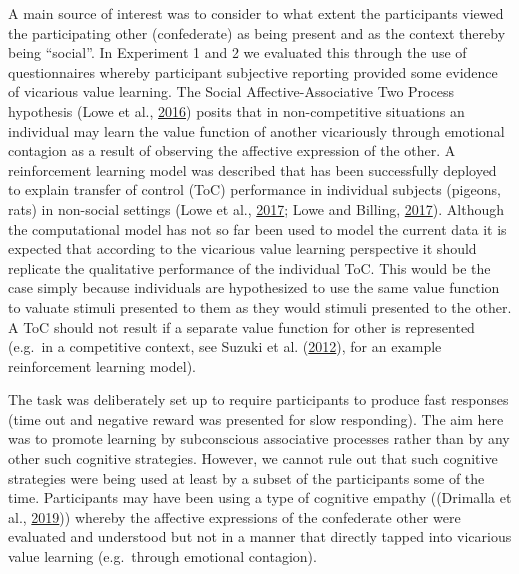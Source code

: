 \documentclass[]{elsarticle} %
\begin{document}
A main source of interest was to consider to what extent the
participants viewed the participating other (confederate) as being
present and as the context thereby being ``social''. In Experiment 1 and
2 we evaluated this through the use of questionnaires whereby
participant subjective reporting provided some evidence of vicarious
value learning. The Social Affective-Associative Two Process hypothesis
(Lowe et al., \protect\hyperlink{ref-lowe2016minimalist}{2016}) posits
that in non-competitive situations an individual may learn the value
function of another vicariously through emotional contagion as a result
of observing the affective expression of the other. A reinforcement
learning model was described that has been successfully deployed to
explain transfer of control (ToC) performance in individual subjects
(pigeons, rats) in non-social settings (Lowe et al.,
\protect\hyperlink{ref-lowe2017affective1}{2017}; Lowe and Billing,
\protect\hyperlink{ref-lowe2017affective}{2017}). Although the
computational model has not so far been used to model the current data
it is expected that according to the vicarious value learning
perspective it should replicate the qualitative performance of the
individual ToC. This would be the case simply because individuals are
hypothesized to use the same value function to valuate stimuli presented
to them as they would stimuli presented to the other. A ToC should not
result if a separate value function for other is represented (e.g.~in a
competitive context, see Suzuki et al.
(\protect\hyperlink{ref-suzuki2012learning}{2012}), for an example
reinforcement learning model).

The task was deliberately set up to require participants to produce fast
responses (time out and negative reward was presented for slow
responding). The aim here was to promote learning by subconscious
associative processes rather than by any other such cognitive
strategies. However, we cannot rule out that such cognitive strategies
were being used at least by a subset of the participants some of the
time. Participants may have been using a type of cognitive empathy
((Drimalla et al., \protect\hyperlink{ref-drimalla2019face}{2019}))
whereby the affective expressions of the confederate other were
evaluated and understood but not in a manner that directly tapped into
vicarious value learning (e.g.~through emotional contagion).
\end{document}
